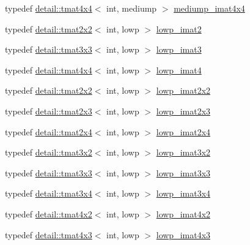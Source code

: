 \begin{DoxyCompactItemize}
typedef \hyperlink{structglm_1_1detail_1_1tmat4x4}{detail\+::tmat4x4}$<$ int, mediump $>$ \hyperlink{group__gtc__matrix__integer_gafa2df6be3aad055867b9bfea34e9c4a0}{mediump\+\_\+imat4x4}
\item 
typedef \hyperlink{structglm_1_1detail_1_1tmat2x2}{detail\+::tmat2x2}$<$ int, lowp $>$ \hyperlink{group__gtc__matrix__integer_gae0df4bc278c1a958a32af9ac82c47630}{lowp\+\_\+imat2}
\item 
typedef \hyperlink{structglm_1_1detail_1_1tmat3x3}{detail\+::tmat3x3}$<$ int, lowp $>$ \hyperlink{group__gtc__matrix__integer_ga149b90591e7275193c85cc08acbf0024}{lowp\+\_\+imat3}
\item 
typedef \hyperlink{structglm_1_1detail_1_1tmat4x4}{detail\+::tmat4x4}$<$ int, lowp $>$ \hyperlink{group__gtc__matrix__integer_ga7c687f14d923e05d5cf14aac41d10993}{lowp\+\_\+imat4}
\item 
typedef \hyperlink{structglm_1_1detail_1_1tmat2x2}{detail\+::tmat2x2}$<$ int, lowp $>$ \hyperlink{group__gtc__matrix__integer_ga05307630bc68a62132a82d1886a0b5e2}{lowp\+\_\+imat2x2}
\item 
typedef \hyperlink{structglm_1_1detail_1_1tmat2x3}{detail\+::tmat2x3}$<$ int, lowp $>$ \hyperlink{group__gtc__matrix__integer_ga5757953c508a6e05bf3573d6c099cf88}{lowp\+\_\+imat2x3}
\item 
typedef \hyperlink{structglm_1_1detail_1_1tmat2x4}{detail\+::tmat2x4}$<$ int, lowp $>$ \hyperlink{group__gtc__matrix__integer_ga4d859ef48cdfb15b2c9acc98064dd272}{lowp\+\_\+imat2x4}
\item 
typedef \hyperlink{structglm_1_1detail_1_1tmat3x2}{detail\+::tmat3x2}$<$ int, lowp $>$ \hyperlink{group__gtc__matrix__integer_ga250780f2be05f698b881b04ba7ce0452}{lowp\+\_\+imat3x2}
\item 
typedef \hyperlink{structglm_1_1detail_1_1tmat3x3}{detail\+::tmat3x3}$<$ int, lowp $>$ \hyperlink{group__gtc__matrix__integer_gae0d6068aaf9b1f8f06c6cc32941f9471}{lowp\+\_\+imat3x3}
\item 
typedef \hyperlink{structglm_1_1detail_1_1tmat3x4}{detail\+::tmat3x4}$<$ int, lowp $>$ \hyperlink{group__gtc__matrix__integer_gaba7c2c9f782278aaa10dad882d73ef0d}{lowp\+\_\+imat3x4}
\item 
typedef \hyperlink{structglm_1_1detail_1_1tmat4x2}{detail\+::tmat4x2}$<$ int, lowp $>$ \hyperlink{group__gtc__matrix__integer_ga0d7055814ab969df3b844ba9c52dbf61}{lowp\+\_\+imat4x2}
\item 
typedef \hyperlink{structglm_1_1detail_1_1tmat4x3}{detail\+::tmat4x3}$<$ int, lowp $>$ \hyperlink{group__gtc__matrix__integer_ga73858cf965b0aa7e72908eb817c192d6}{lowp\+\_\+imat4x3}

\end{DoxyCompactItemize}
